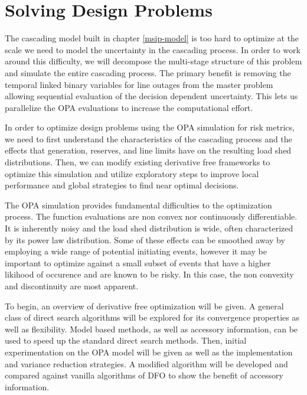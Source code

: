 \newcommand{\mypathdfo}{../thesis/dfo}
\newcommand{\mypathdfodata}{../thesis/dfo/data}
\newcommand{\scd}{\cD_\oplus}
\newcommand{\btu}{\bigtriangleup}
\chapter{Solving Design Problems}

The cascading model built in chapter \ref{msip-model} is too hard to optimize at the scale we need to model the uncertainty in the cascading process.  In order to work around this difficulty, we will decompose the multi-stage structure of this problem and simulate the entire cascading process.  The primary benefit is removing the temporal linked binary variables for line outages from the master problem allowing sequential evaluation of the decision dependent uncertainty.  This lets us parallelize the OPA evaluations to increase the computational effort.

In order to optimize design problems using the OPA simulation for risk metrics, we need to first understand the characteristics of the cascading process and the effects that generation, reserves, and line limits have on the resulting load shed distributions.  Then, we can modify existing derivative free frameworks to optimize this simulation and utilize exploratory steps to improve local performance and global strategies to find near optimal decisions.

The OPA simulation provides fundamental difficulties to the optimization process.  The function evaluations are non convex nor continuously differentiable.  It is inherently noisy and the load shed distribution is wide, often characterized by its power law distribution.  Some of these effects can be smoothed away by employing a wide range of potential initiating events, however it may be important to optimize against a small subset of events that have a higher likihood of occurence and are known to be risky.  In this case, the non convexity and discontinuity are most apparent.

To begin, an overview of derivative free optimization will be given.  A general class of direct search algorithms will be explored for its convergence properties as well as flexibility.  Model based methods, as well as accessory information, can be used to speed up the standard direct search methods.  Then, initial experimentation on the OPA model will be given as well as the implementation and variance reduction strategies.  A modified algorithm will be developed and compared against vanilla algorithms of DFO to show the benefit of accessory information. 

